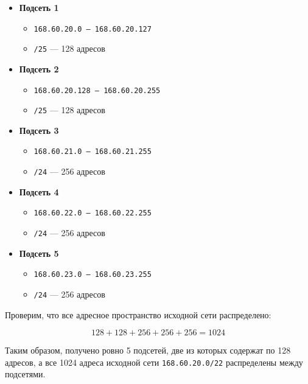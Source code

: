 \begin{itemize}
    \item \textbf{Подсеть 1}
    \begin{itemize}
        \item \texttt{168.60.20.0 -- 168.60.20.127}
        \item \texttt{/25} --- 128 адресов
    \end{itemize}

    \item \textbf{Подсеть 2}
    \begin{itemize}
        \item \texttt{168.60.20.128 -- 168.60.20.255}
        \item \texttt{/25} --- 128 адресов
    \end{itemize}

    \item \textbf{Подсеть 3}
    \begin{itemize}
        \item \texttt{168.60.21.0 -- 168.60.21.255}
        \item \texttt{/24} --- 256 адресов
    \end{itemize}

    \item \textbf{Подсеть 4}
    \begin{itemize}
        \item \texttt{168.60.22.0 -- 168.60.22.255}
        \item \texttt{/24} --- 256 адресов
    \end{itemize}

    \item \textbf{Подсеть 5}
    \begin{itemize}
        \item \texttt{168.60.23.0 -- 168.60.23.255}
        \item \texttt{/24} --- 256 адресов
    \end{itemize}
\end{itemize}

\noindent
Проверим, что все адресное пространство исходной сети распределено:

\[
128 + 128 + 256 + 256 + 256 = 1024
\]

Таким образом, получено ровно 5 подсетей, две из которых содержат по 128 адресов, а все 1024 адреса исходной сети \texttt{168.60.20.0/22} распределены между подсетями.